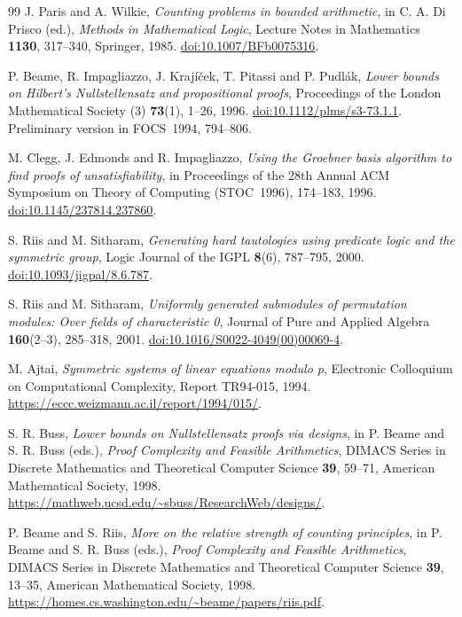 \documentclass[11pt,a4paper]{article}
\theoremstyle{definition}\newtheorem{definition}[theorem]{Definition}
\theoremstyle{remark}\newtheorem{remark}[theorem]{Remark}
\begin{document}
\begin{thebibliography}{99}
J. Paris and A. Wilkie, \emph{Counting problems in bounded arithmetic},
in C. A. Di Prisco (ed.), \emph{Methods in Mathematical Logic},
Lecture Notes in Mathematics \textbf{1130}, 317--340, Springer, 1985.
\href{https://doi.org/10.1007/BFb0075316}{doi:10.1007/BFb0075316}.


P. Beame, R. Impagliazzo, J. Kraj\'i\v cek, T. Pitassi and P. Pudl\'ak,
\emph{Lower bounds on Hilbert's Nullstellensatz and propositional proofs},
Proceedings of the London Mathematical Society (3)
\textbf{73}(1), 1--26, 1996.
\href{https://doi.org/10.1112/plms/s3-73.1.1}{doi:10.1112/plms/s3-73.1.1}.
Preliminary version in FOCS~1994, 794--806.

M. Clegg, J. Edmonds and R. Impagliazzo,
\emph{Using the Groebner basis algorithm to find proofs of unsatisfiability},
in Proceedings of the 28th Annual ACM Symposium on Theory of Computing
(STOC~1996), 174--183, 1996.
\href{https://doi.org/10.1145/237814.237860}{doi:10.1145/237814.237860}.

S. Riis and M. Sitharam,
\emph{Generating hard tautologies using predicate logic and the symmetric group},
Logic Journal of the IGPL \textbf{8}(6), 787--795, 2000.
\href{https://doi.org/10.1093/jigpal/8.6.787}{doi:10.1093/jigpal/8.6.787}.

S. Riis and M. Sitharam,
\emph{Uniformly generated submodules of permutation modules:
Over fields of characteristic 0},
Journal of Pure and Applied Algebra \textbf{160}(2--3), 285--318, 2001.
\href{https://doi.org/10.1016/S0022-4049(00)00069-4}{doi:10.1016/S0022-4049(00)00069-4}.

M. Ajtai, \emph{Symmetric systems of linear equations modulo p},
Electronic Colloquium on Computational Complexity, Report TR94-015, 1994.
\url{https://eccc.weizmann.ac.il/report/1994/015/}.

S. R. Buss, \emph{Lower bounds on Nullstellensatz proofs via designs},
in P. Beame and S. R. Buss (eds.), \emph{Proof Complexity and Feasible
Arithmetics}, DIMACS Series in Discrete Mathematics and Theoretical
Computer Science \textbf{39}, 59--71, American Mathematical Society, 1998.
\url{https://mathweb.ucsd.edu/~sbuss/ResearchWeb/designs/}.

P. Beame and S. Riis, \emph{More on the relative strength of counting
principles}, in P. Beame and S. R. Buss (eds.), \emph{Proof Complexity
and Feasible Arithmetics}, DIMACS Series in Discrete Mathematics and
Theoretical Computer Science \textbf{39}, 13--35,
American Mathematical Society, 1998.
\url{https://homes.cs.washington.edu/~beame/papers/riis.pdf}.


\end{thebibliography}
\end{document}
